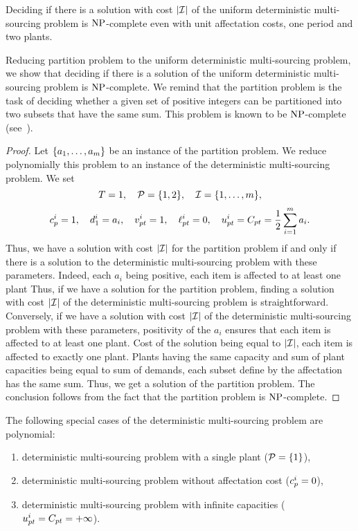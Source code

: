 \begin{thm}\label{thm:deterministic-multi-sourcing:NP-hard:2-plants}
Deciding if there is a solution with cost $\card{\REF}$ of the uniform deterministic multi-sourcing problem is $\operatorname{NP}$-complete even with unit affectation costs, one period and two plants.
\end{thm}


Reducing partition problem to the uniform deterministic multi-sourcing problem, we show that deciding if there is a solution of the uniform deterministic multi-sourcing problem is $\operatorname{NP}$-complete. We remind that the partition problem is the task of deciding whether a given set of positive integers can be partitioned into two subsets that have the same sum. This problem is known to be $\operatorname{NP}$-complete (see~\cite{Garey1979}).


\begin{proof}
Let $\crbracket{a_1,\ldots,a_m}$ be an instance of the partition problem.
We reduce polynomially this problem to an instance of the deterministic multi-sourcing problem.
We set
$$
  \horizon=1
  ,\quad
  \plants=\crbracket{1,2}
  ,\quad
  \REF=\range[1]{m},
$$
$$
  c_p^i=1
  ,\quad
  d_1^i=a_i
  ,\quad
  v_{pt}^i=1
  ,\quad
  \ell_{pt}^i=0
  ,\quad
  u_{pt}^i=C_{pt}=\frac{1}{2}\sum_{i=1}^{m}a_i.
$$
Thus, we have a solution with cost $\card{\REF}$ for the partition problem if and only if there is a solution to the deterministic multi-sourcing problem with these parameters.
Indeed, each $a_i$ being positive, each item is affected to at least one plant
Thus, if we have a solution for the partition problem, finding a solution with cost $\card{\REF}$ of the deterministic multi-sourcing problem is straightforward.
Conversely, if we have a solution with cost $\card{\REF}$ of the deterministic multi-sourcing problem with these parameters, positivity of the $a_i$ ensures that each item is affected to at least one plant.
Cost of the solution being equal to $\card{\REF}$, each item is affected to exactly one plant.
Plants having the same capacity and sum of plant capacities being equal to sum of demands, each subset define by the affectation has the same sum.
Thus, we get a solution of the partition problem.
The conclusion follows from the fact that the partition problem is $\operatorname{NP}$-complete.
\end{proof}


\begin{prop}\label{prop:deterministic-multi-sourcing:polynomial-cases}
The following special cases of the deterministic multi-sourcing problem are polynomial:
\begin{enumerate}
  \item deterministic multi-sourcing problem with a single plant ($\plants=\crbracket{1}$),
  \item deterministic multi-sourcing problem without affectation cost ($c_p^i=0$),
  \item deterministic multi-sourcing problem with infinite capacities ($u_{pt}^i=C_{pt}=+\infty$).
\end{enumerate}
\end{prop}


